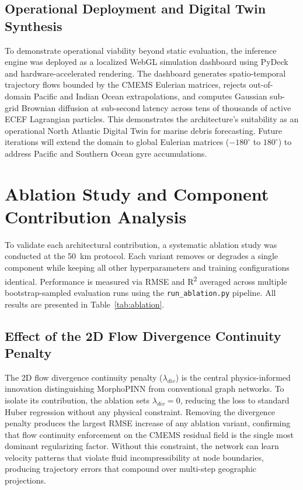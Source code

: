 \documentclass[conference]{IEEEtran}
\begin{document}
\subsection{Operational Deployment and Digital Twin Synthesis}
To demonstrate operational viability beyond static evaluation, the inference engine was deployed as a localized WebGL simulation dashboard using PyDeck and hardware-accelerated rendering. The dashboard generates spatio-temporal trajectory flows bounded by the CMEMS Eulerian matrices, rejects out-of-domain Pacific and Indian Ocean extrapolations, and computes Gaussian sub-grid Brownian diffusion at sub-second latency across tens of thousands of active ECEF Lagrangian particles. This demonstrates the architecture's suitability as an operational North Atlantic Digital Twin for marine debris forecasting. Future iterations will extend the domain to global Eulerian matrices ($-180^\circ$ to $180^\circ$) to address Pacific and Southern Ocean gyre accumulations.


\section{Ablation Study and Component Contribution Analysis}

To validate each architectural contribution, a systematic ablation study was conducted at the 50~km protocol. Each variant removes or degrades a single component while keeping all other hyperparameters and training configurations identical. Performance is measured via RMSE and R\textsuperscript{2} averaged across multiple bootstrap-sampled evaluation runs using the \texttt{run\_ablation.py} pipeline. All results are presented in Table~\ref{tab:ablation}.

\subsection{Effect of the 2D Flow Divergence Continuity Penalty}

The 2D flow divergence continuity penalty ($\lambda_{div}$) is the central physics-informed innovation distinguishing MorphoPINN from conventional graph networks. To isolate its contribution, the ablation sets $\lambda_{div} = 0$, reducing the loss to standard Huber regression without any physical constraint. Removing the divergence penalty produces the largest RMSE increase of any ablation variant, confirming that flow continuity enforcement on the CMEMS residual field is the single most dominant regularizing factor. Without this constraint, the network can learn velocity patterns that violate fluid incompressibility at node boundaries, producing trajectory errors that compound over multi-step geographic projections.
\end{document}

